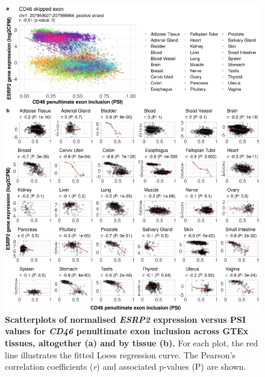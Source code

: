 \begin{figure}[!p]
  \includegraphics[width=1\textwidth]{images/psichomics/8-gtex-cor}
  \centering
  \caption[\emph{ESRP2} expression versus \emph{CD46} penultimate exon PSI in GTEx]{\textbf{Scatterplots of normalised \emph{ESRP2} expression versus PSI values for \emph{CD46} penultimate exon inclusion across GTEx tissues, altogether (a) and by tissue (b).} For each plot, the red line illustrates the fitted Loess regression curve. The Pearson’s correlation coefficients (\emph{r}) and associated p-values (P) are shown.}
  \label{fig:psichomics-gtex-cor}
\end{figure}

